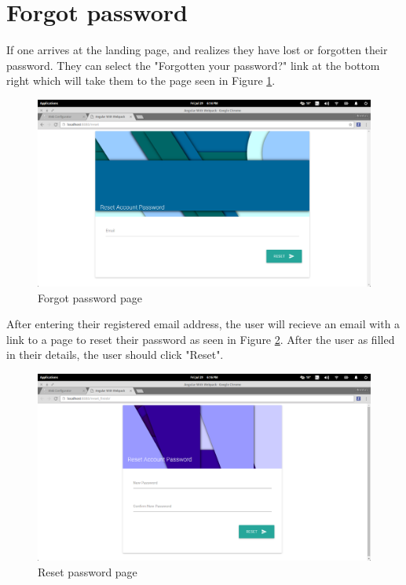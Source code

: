 \documentclass[11pt,a4paper]{article}
\begin{document}
\section{Forgot password}
If one arrives at the landing page, and realizes they have lost or forgotten their password. They can select the
"Forgotten your password?" link at the bottom right which will take them to the page seen in Figure \ref{fig:forgotPage}.
\begin{figure}[H]
	\begin{center}
		\includegraphics[scale=0.6]{../Images/User Manual/Forgot Page.png}
		\caption{Forgot password page}
		\label{fig:forgotPage}
	\end{center}  
\end{figure}
After entering their registered email address, the user will recieve an email with a link to a page to reset their password
as seen in Figure \ref{fig:resetPage}. After the user as filled in their details, the user should click "Reset".
\begin{figure}[H]
	\begin{center}
		\includegraphics[scale=0.6]{../Images/User Manual/Reset Page.png}
		\caption{Reset password page}
		\label{fig:resetPage}
	\end{center}  
\end{figure}
\end{document}
